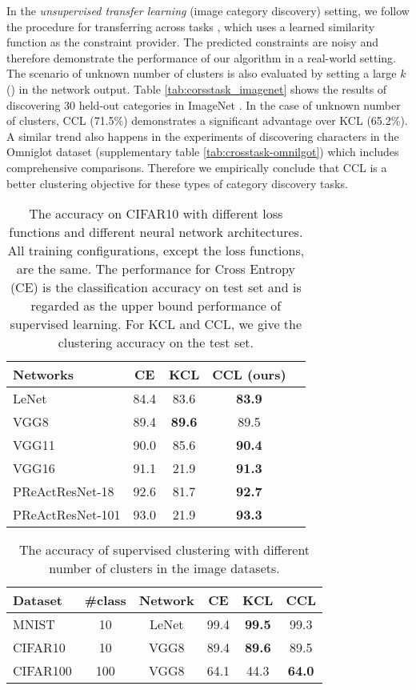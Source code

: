 \documentclass[10pt,twocolumn,letterpaper]{article}
\begin{document}
In the \emph{unsupervised transfer learning} (\ie image category discovery) setting, we follow the procedure for transferring across tasks \cite{Hsu18iclr}, which uses a learned similarity function as the constraint provider. The predicted constraints are noisy and therefore demonstrate the performance of our algorithm in a real-world setting. The scenario of unknown number of clusters is also evaluated by setting a large $k$ () in the network output. Table \ref{tab:corsstask_imagenet} shows the results of discovering 30 held-out categories in ImageNet \cite{deng2019imagenet}. In the case of unknown number of clusters, CCL (71.5\%) demonstrates a significant advantage over KCL (65.2\%). A similar trend also happens in the experiments of discovering characters in the Omniglot dataset (supplementary table \ref{tab:crosstask-omnilgot}) which includes comprehensive comparisons. Therefore we empirically conclude that CCL is a better clustering objective for these types of category discovery tasks.

\begin{table}
\centering
\caption{The accuracy on CIFAR10 with different loss functions and different neural network architectures. All training configurations, except the loss functions, are the same. The performance for Cross Entropy (CE) is the classification accuracy on test set and is regarded as the upper bound performance of supervised learning. For KCL and CCL, we give the clustering accuracy \cite{yang2010image} on the test set.}
\label{deepnet}
\begin{tabular}{@{}lc|ccc@{}}
\toprule
Networks           & CE & KCL     & CCL (ours)      \\ \midrule
LeNet              & 84.4 & 83.6  & \textbf{83.9}    \\ 
VGG8               & 89.4        & \textbf{89.6}  & 89.5    \\
VGG11              & 90.0        & 85.6  & \textbf{90.4}    \\
VGG16              & 91.1        & 21.9  & \textbf{91.3}    \\
PReActResNet-18    & 92.6        & 81.7  & \textbf{92.7}    \\
PReActResNet-101   & 93.0        & 21.9  & \textbf{93.3}    \\
\bottomrule
\end{tabular}
\end{table}

\begin{table}
\centering
\caption{The accuracy of supervised clustering with different number of clusters in the image datasets.}
\label{supdatasets}
\begin{tabular}{lccc|cc}
\toprule
Dataset  & \#class & Network & CE     & KCL   & CCL       \\ \midrule
MNIST    & 10      & LeNet & 99.4   & \textbf{99.5}  & 99.3     \\
CIFAR10  & 10      & VGG8 & 89.4   & \textbf{89.6}  & 89.5     \\
CIFAR100 & 100     & VGG8 & 64.1   & 44.3  & \textbf{64.0}     \\ 
\bottomrule
\end{tabular}
\end{table}
\end{document}
